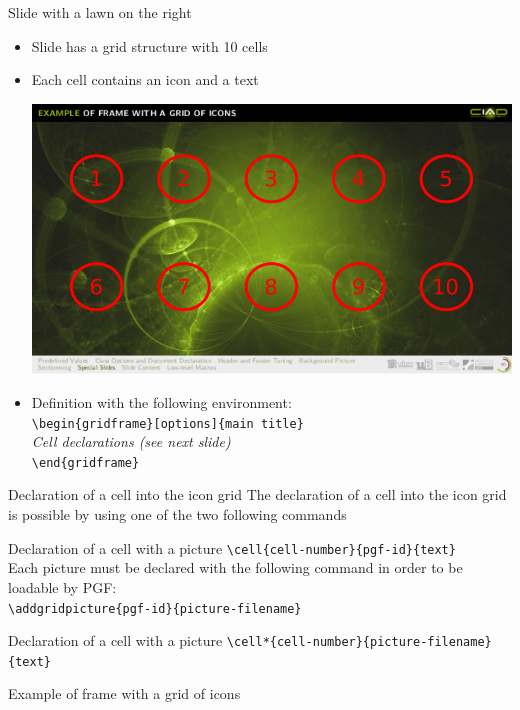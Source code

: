 \documentclass[english,sectioncirclenumberstyle]{ciadbeamer}
\begin{document}
\begin{frame}[t]{Slide with a lawn on the right}
	\begin{itemize}
		\item Slide has a grid structure with 10 cells
		\item Each cell contains an icon and a text
			\begin{center}
				\includegraphics[width=.5\linewidth]{gridframe}
			\end{center}
		\item Definition with the following environment: \\
			\texttt{{\textbackslash}begin\{gridframe\}[options]\{main title\}} \\
			\emph{Cell declarations (see next slide)} \\
			\texttt{{\textbackslash}end\{gridframe\}}
	\end{itemize}
\end{frame}

\begin{frame}{{Declaration of a cell} into the icon grid}
	The declaration of a cell into the icon grid is possible by using one of the two following commands
	\begin{block}{Declaration of a cell with a picture }
		\texttt{{\textbackslash}cell\{cell-number\}\{pgf-id\}\{text\}} \\[.25cm]
		Each picture must be declared with the following command in order to be loadable by PGF: \\
			\texttt{{\textbackslash}addgridpicture\{pgf-id\}\{picture-filename\}}
	\end{block}
	\begin{block}{Declaration of a cell with a picture }
		\texttt{{\textbackslash}cell*\{cell-number\}\{picture-filename\}\{text\}}
	\end{block}
\end{frame}

\begin{gridframe}{{Example of frame} with a grid of icons}
\end{gridframe}
\end{document}
